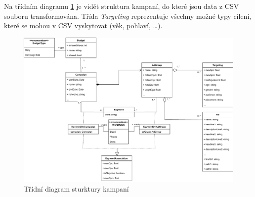 Na třídním diagramu \ref{fig:campaigns-class-diagram} je vidět struktura kampaní, do které jsou data z CSV souboru transformována. Třída \emph{Targeting} reprezentuje všechny
možné typy cílení, které se mohou v CSV vyskytovat (věk, pohlaví, \ldots). 

\begin{figure}[h]
    \centering
    \includegraphics[width=1\textwidth]{Figures/campaigns-class-diagram.pdf}
    \caption{Třídní diagram sturktury kampaní}
    \label{fig:campaigns-class-diagram}
\end{figure}



